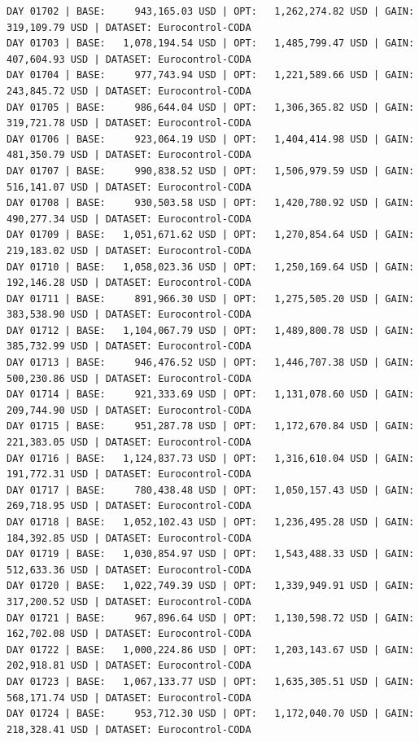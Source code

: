 \documentclass[11pt,a4paper]{article}
\begin{document}
\begin{verbatim}
DAY 01702 | BASE:     943,165.03 USD | OPT:   1,262,274.82 USD | GAIN: 319,109.79 USD | DATASET: Eurocontrol-CODA
DAY 01703 | BASE:   1,078,194.54 USD | OPT:   1,485,799.47 USD | GAIN: 407,604.93 USD | DATASET: Eurocontrol-CODA
DAY 01704 | BASE:     977,743.94 USD | OPT:   1,221,589.66 USD | GAIN: 243,845.72 USD | DATASET: Eurocontrol-CODA
DAY 01705 | BASE:     986,644.04 USD | OPT:   1,306,365.82 USD | GAIN: 319,721.78 USD | DATASET: Eurocontrol-CODA
DAY 01706 | BASE:     923,064.19 USD | OPT:   1,404,414.98 USD | GAIN: 481,350.79 USD | DATASET: Eurocontrol-CODA
DAY 01707 | BASE:     990,838.52 USD | OPT:   1,506,979.59 USD | GAIN: 516,141.07 USD | DATASET: Eurocontrol-CODA
DAY 01708 | BASE:     930,503.58 USD | OPT:   1,420,780.92 USD | GAIN: 490,277.34 USD | DATASET: Eurocontrol-CODA
DAY 01709 | BASE:   1,051,671.62 USD | OPT:   1,270,854.64 USD | GAIN: 219,183.02 USD | DATASET: Eurocontrol-CODA
DAY 01710 | BASE:   1,058,023.36 USD | OPT:   1,250,169.64 USD | GAIN: 192,146.28 USD | DATASET: Eurocontrol-CODA
DAY 01711 | BASE:     891,966.30 USD | OPT:   1,275,505.20 USD | GAIN: 383,538.90 USD | DATASET: Eurocontrol-CODA
DAY 01712 | BASE:   1,104,067.79 USD | OPT:   1,489,800.78 USD | GAIN: 385,732.99 USD | DATASET: Eurocontrol-CODA
DAY 01713 | BASE:     946,476.52 USD | OPT:   1,446,707.38 USD | GAIN: 500,230.86 USD | DATASET: Eurocontrol-CODA
DAY 01714 | BASE:     921,333.69 USD | OPT:   1,131,078.60 USD | GAIN: 209,744.90 USD | DATASET: Eurocontrol-CODA
DAY 01715 | BASE:     951,287.78 USD | OPT:   1,172,670.84 USD | GAIN: 221,383.05 USD | DATASET: Eurocontrol-CODA
DAY 01716 | BASE:   1,124,837.73 USD | OPT:   1,316,610.04 USD | GAIN: 191,772.31 USD | DATASET: Eurocontrol-CODA
DAY 01717 | BASE:     780,438.48 USD | OPT:   1,050,157.43 USD | GAIN: 269,718.95 USD | DATASET: Eurocontrol-CODA
DAY 01718 | BASE:   1,052,102.43 USD | OPT:   1,236,495.28 USD | GAIN: 184,392.85 USD | DATASET: Eurocontrol-CODA
DAY 01719 | BASE:   1,030,854.97 USD | OPT:   1,543,488.33 USD | GAIN: 512,633.36 USD | DATASET: Eurocontrol-CODA
DAY 01720 | BASE:   1,022,749.39 USD | OPT:   1,339,949.91 USD | GAIN: 317,200.52 USD | DATASET: Eurocontrol-CODA
DAY 01721 | BASE:     967,896.64 USD | OPT:   1,130,598.72 USD | GAIN: 162,702.08 USD | DATASET: Eurocontrol-CODA
DAY 01722 | BASE:   1,000,224.86 USD | OPT:   1,203,143.67 USD | GAIN: 202,918.81 USD | DATASET: Eurocontrol-CODA
DAY 01723 | BASE:   1,067,133.77 USD | OPT:   1,635,305.51 USD | GAIN: 568,171.74 USD | DATASET: Eurocontrol-CODA
DAY 01724 | BASE:     953,712.30 USD | OPT:   1,172,040.70 USD | GAIN: 218,328.41 USD | DATASET: Eurocontrol-CODA

\end{verbatim}
\end{document}
